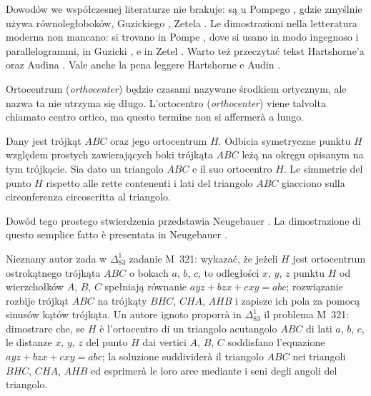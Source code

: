 Dowodów we współczesnej literaturze nie brakuje: są u Pompego \cite[s. 38]{pompe_2022}, gdzie zmyślnie używa równoległoboków, Guzickiego \cite[s. 218]{guzicki_2021}, Zetela \cite[s. 14, 151]{zetel_2020}. %
Le dimostrazioni nella letteratura moderna non mancano: si trovano in Pompe \cite[p.~38]{pompe_2022}, dove si usano in modo ingegnoso i parallelogrammi, in Guzicki \cite[p.~218]{guzicki_2021}, e in Zetel \cite[pp.~14, 151]{zetel_2020}. %
Warto też przeczytać tekst Hartshorne'a \cite[s. 54]{hartshorne_2000} oraz Audina \cite[s. 61]{audin_2003}. %
Vale anche la pena leggere Hartshorne \cite[p.~54]{hartshorne_2000} e Audin \cite[p.~61]{audin_2003}. %

Ortocentrum (\emph{orthocenter}) będzie czasami nazywane środkiem ortycznym, ale nazwa ta nie utrzyma się długo. %
L'ortocentro (\emph{orthocenter}) viene talvolta chiamato centro ortico, ma questo termine non si affermerà a lungo. %

\begin{proposition}
    Dany jest trójkąt $ABC$ oraz jego ortocentrum $H$. %
    Odbicia symetryczne punktu $H$ względem prostych zawierających boki trójkąta $ABC$ leżą na okręgu opisanym na tym trójkącie. %
    Sia dato un triangolo $ABC$ e il suo ortocentro $H$. %
    Le simmetrie del punto $H$ rispetto alle rette contenenti i lati del triangolo $ABC$ giacciono sulla circonferenza circoscritta al triangolo. %
\end{proposition}

Dowód tego prostego stwierdzenia przedstawia Neugebauer \cite[s. 28]{neugebauer_2018}. %
La dimostrazione di questo semplice fatto è presentata in Neugebauer \cite[p.~28]{neugebauer_2018}. %

Nieznany autor zada w $\Delta_{83}^{1}$ zadanie M~321: wykazać, że jeżeli $H$ jest ortocentrum ostrokątnego trójkąta $ABC$ o bokach $a$, $b$, $c$, to odległości $x$, $y$, $z$ punktu $H$ od wierzchołków $A$, $B$, $C$ spełniają równanie $ayz + bzx + cxy = abc$; rozwiązanie rozbije trójkąt $ABC$ na trójkąty $BHC$, $CHA$, $AHB$ i zapisze ich pola za pomocą sinusów kątów trójkąta. %
Un autore ignoto proporrà in $\Delta_{83}^{1}$ il problema M~321: dimostrare che, se $H$ è l'ortocentro di un triangolo acutangolo $ABC$ di lati $a$, $b$, $c$, le distanze $x$, $y$, $z$ del punto $H$ dai vertici $A$, $B$, $C$ soddisfano l'equazione $ayz + bzx + cxy = abc$; la soluzione suddividerà il triangolo $ABC$ nei triangoli $BHC$, $CHA$, $AHB$ ed esprimerà le loro aree mediante i seni degli angoli del triangolo. %

%